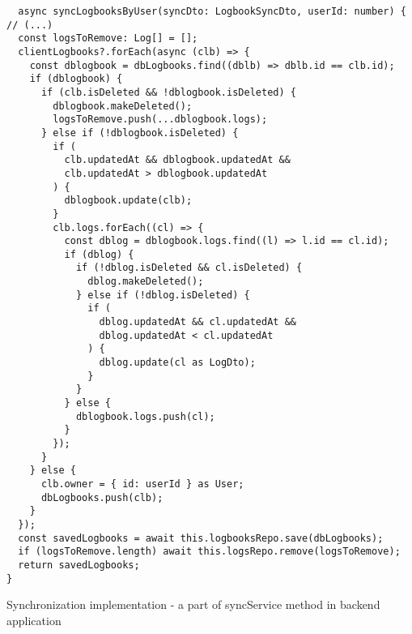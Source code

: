 \begin{listing}[H]
    \begin{verbatim}
  async syncLogbooksByUser(syncDto: LogbookSyncDto, userId: number) {
// (...)
  const logsToRemove: Log[] = [];
  clientLogbooks?.forEach(async (clb) => {
    const dblogbook = dbLogbooks.find((dblb) => dblb.id == clb.id);
    if (dblogbook) {
      if (clb.isDeleted && !dblogbook.isDeleted) {
        dblogbook.makeDeleted();
        logsToRemove.push(...dblogbook.logs);
      } else if (!dblogbook.isDeleted) {
        if (
          clb.updatedAt && dblogbook.updatedAt && 
          clb.updatedAt > dblogbook.updatedAt
        ) {
          dblogbook.update(clb);
        }
        clb.logs.forEach((cl) => {
          const dblog = dblogbook.logs.find((l) => l.id == cl.id);
          if (dblog) {
            if (!dblog.isDeleted && cl.isDeleted) {
              dblog.makeDeleted();
            } else if (!dblog.isDeleted) {
              if (
                dblog.updatedAt && cl.updatedAt &&
                dblog.updatedAt < cl.updatedAt
              ) {
                dblog.update(cl as LogDto);
              }
            }
          } else {
            dblogbook.logs.push(cl);
          }
        });
      }
    } else {
      clb.owner = { id: userId } as User;
      dbLogbooks.push(clb);
    }
  });
  const savedLogbooks = await this.logbooksRepo.save(dbLogbooks);
  if (logsToRemove.length) await this.logsRepo.remove(logsToRemove);
  return savedLogbooks;
}
    \end{verbatim}
\caption[Synchronization implementation]{Synchronization implementation - a part of syncService method in backend application}
\end{listing}


